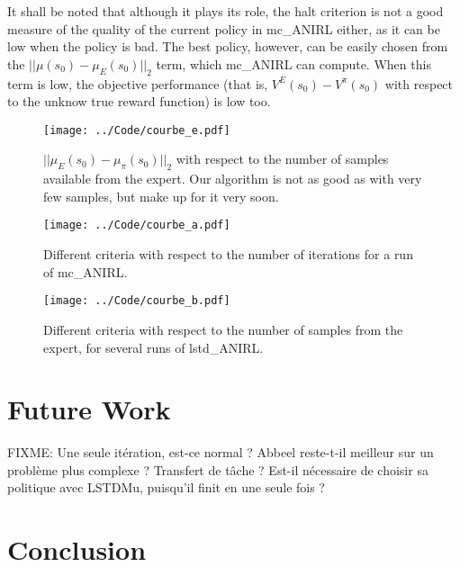 \documentclass{article}
\begin{document}
It shall be noted that although it plays its role, the halt criterion is not a good measure of the quality of the current policy in mc\_ANIRL either, as it can be low when the policy is bad. The best policy, however, can be easily chosen from the $||\mu(s_0) - \mu_E(s_0)||_2$ term, which mc\_ANIRL can compute. When this term is low, the objective performance (that is, $V^E(s_0)-V^\pi(s_0)$ with respect to the unknow true reward function) is low too.
\begin{figure}
\texttt{[image: ../Code/courbe\_e.pdf]}
\caption{$||\mu_E(s_0)-\mu_\pi(s_0)||_2$ with respect to the number of samples available from the expert. Our algorithm is not as good as \citet{abbeel2004apprenticeship} with very few samples, but make up for it very soon.}
\label{fig:E}
\end{figure}
\label{sec:perf}
\begin{figure}
\texttt{[image: ../Code/courbe\_a.pdf]}
\caption{Different criteria with respect to the number of iterations for a run of mc\_ANIRL.}
\label{fig:A}
\end{figure}
\begin{figure}
\texttt{[image: ../Code/courbe\_b.pdf]}
\caption{Different criteria with respect to the number of samples from the expert, for several runs of lstd\_ANIRL.}
\label{fig:B}
\end{figure}
\section{Future Work}
FIXME: Une seule itération, est-ce normal ? Abbeel reste-t-il meilleur sur un problème plus complexe ? Transfert de tâche ? Est-il nécessaire de choisir sa politique avec LSTDMu, puisqu'il finit en une seule fois ?
\section{Conclusion}


\end{document}
